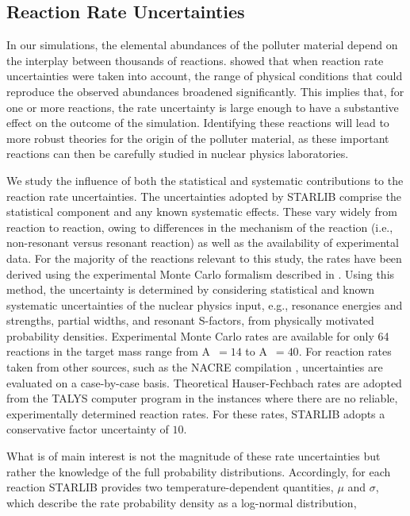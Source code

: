\documentclass[twocolumn]{aastex6}
\begin{document}
\subsection{Reaction Rate Uncertainties}
\label{sec:stats}
In our simulations, the elemental abundances of the polluter material depend on the interplay between thousands of reactions.
\citet{Iliadis_2016} showed that when reaction rate uncertainties were taken into account, 
the range of physical conditions that could reproduce the observed abundances broadened significantly.
This implies that, for one or more reactions, the rate uncertainty is large enough to have a substantive effect on the outcome of the simulation. 
Identifying these reactions will lead to more robust theories for the origin of the polluter material, as these important reactions
can then be carefully studied in nuclear physics laboratories.
\par
We study the influence of both the statistical and systematic contributions to the reaction rate uncertainties.
The uncertainties adopted by STARLIB comprise the statistical component and any known systematic effects.
These vary widely from reaction to reaction, owing to differences in the mechanism of the reaction (i.e., non-resonant versus resonant reaction) as well as the availability of experimental data.
For the majority of the reactions relevant to this study, the rates have been derived using the experimental Monte Carlo formalism described in \cite{Longland_2010}. Using this method, the uncertainty is determined by considering statistical and known systematic uncertainties of the nuclear physics input, e.g., resonance energies and strengths, partial widths, and resonant S-factors, from physically motivated probability densities. 
Experimental Monte Carlo rates are available for only 64 reactions in the target mass range from A~$=14$ to A~$=40$. 
For reaction rates taken from other sources, such as the NACRE compilation \citep{Angulo_1999}, uncertainties are evaluated on a case-by-case basis. 
Theoretical Hauser-Fechbach rates are adopted from the TALYS computer program \citep{Konig_2004} in the instances where there are no reliable, experimentally determined reaction rates. For these rates, STARLIB adopts a conservative factor uncertainty of $10$.
\par
What is of main interest is not the magnitude of these rate uncertainties but rather the knowledge of the full probability distributions.
Accordingly, for each reaction STARLIB provides two temperature-dependent quantities, $\mu$ and $\sigma$, which describe the rate probability density as a log-normal distribution,
\end{document}
